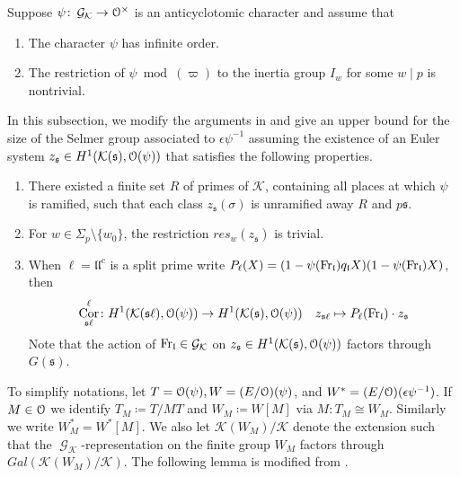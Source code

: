 \documentclass[leqno]{amsart}
\theoremstyle{definition}
\theoremstyle{remark}
\newcommand{\eo}{\EuScript{O}}
\DeclareMathOperator{\Cor}{Cor}
\DeclareMathOperator{\Gal}{\mathcal{G}}
\newcommand{\Fr}{\textnormal{Fr}} %
\newcommand{\fl}{\mathfrak{l}}
\newcommand{\fs}{\mathfrak{s}}
\newcommand{\K}{{\mathcal{K}}} %
\begin{document}
Suppose $\psi\colon \Gal_\K\to \eo^\times$
is an anticyclotomic character and assume that
\begin{enumerate}[label=($\psi$\alph*)]
\item The character $\psi$ has infinite order.
\label{cond:psi1}
\item The restriction of $\psi\bmod (\varpi)$ to
the inertia group $I_w$ for some $w\mid p$ is nontrivial.
\label{cond:psi2}
\end{enumerate}
In this subsection,
we modify the arguments in \cite{Rubin}
and give an upper bound for the size
of the Selmer group associated to 
$\epsilon\psi^{-1}$
assuming the existence of an Euler system
$z_\fs\in H^1(\K(\fs), \eo(\psi))$ that satisfies
the following properties.
\begin{enumerate}
    \item There existed a finite set $R$ of primes of $\K$,
    containing all places at which $\psi$ is ramified,
    such that each class $z_\fs(\sigma)$ is unramified 
    away $R$ and $p\fs$.
    \item For $w\in \Sigma_p\setminus\{w_0\}$,
    the restriction $res_{w}(z_\fs)$ is trivial.
    \item When $\ell=\fl\fl^c$ is a split prime write 
    $P_\ell(X)=(1-\psi(\Fr_\fl)q_\fl X)(1-\psi(\Fr_\fl)X)$, then
    \[
        \Cor_{\fs\ell}^\ell\colon
        H^1(\K(\fs\ell),\eo(\psi))\to
        H^1(\K(\fs),\eo(\psi))\quad
        z_{\fs\ell}\mapsto P_\ell(\Fr_\fl)\cdot z_\fs
    \]
    Note that the action of $\Fr_\fl\in \Gal_\K$
    on $z_\fs\in H^1(\K(\fs),\eo(\psi))$
    factors through $G(\fs)$.
\end{enumerate}
To simplify notations,
let $T=\eo(\psi), W=(E/\eo)(\psi)$,
and $W^*=(E/\eo)(\epsilon\psi^{-1})$.
If $M\in\eo$
we identify $T_M\coloneqq T/MT$ and $W_M\coloneqq W[M]$
via $M\colon T_M\cong W_M$.
Similarly we write $W^*_M=W^*[M]$.
We also let $\K(W_M)/\K$
denote the extension such that
the $\Gal_\K$-representation on the finite group $W_M$
factors through $Gal(\K(W_M)/\K)$.
The following lemma 
is modified from \cite[Lem 4.1.3]{Rubin}.
\end{document}
